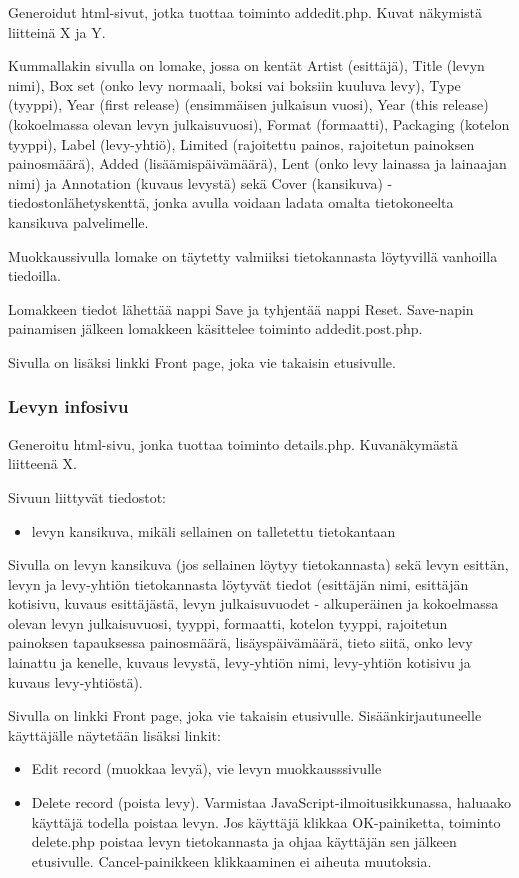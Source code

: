 \documentclass[a4paper,12pt]{report}
\begin{document}
Generoidut html-sivut, jotka tuottaa toiminto addedit.php. Kuvat näkymistä
liitteinä X ja Y.

Kummallakin sivulla on lomake, jossa on kentät Artist (esittäjä), Title
(levyn nimi), Box set (onko levy normaali, boksi vai boksiin kuuluva levy),
Type (tyyppi), Year (first release) (ensimmäisen julkaisun vuosi), Year
(this release) (kokoelmassa olevan levyn julkaisuvuosi), Format (formaatti),
Packaging (kotelon tyyppi), Label (levy-yhtiö), Limited (rajoitettu painos,
rajoitetun painoksen painosmäärä), Added (lisäämispäivämäärä), Lent (onko
levy lainassa ja lainaajan nimi) ja Annotation (kuvaus levystä) sekä Cover
(kansikuva) -tiedostonlähetyskenttä, jonka avulla voidaan ladata omalta
tietokoneelta kansikuva palvelimelle.

Muokkaussivulla lomake on täytetty valmiiksi tietokannasta löytyvillä
vanhoilla tiedoilla.

Lomakkeen tiedot lähettää nappi Save ja tyhjentää nappi Reset. Save-napin
painamisen jälkeen lomakkeen käsittelee toiminto addedit.post.php.

Sivulla on lisäksi linkki Front page, joka vie takaisin etusivulle.

\subsubsection{Levyn infosivu}

Generoitu html-sivu, jonka tuottaa toiminto details.php. Kuvanäkymästä
liitteenä X.

Sivuun liittyvät tiedostot:
\begin{itemize}
  \item levyn kansikuva, mikäli sellainen on talletettu tietokantaan
\end{itemize}

Sivulla on levyn kansikuva (jos sellainen löytyy tietokannasta) sekä levyn
esittän, levyn ja levy-yhtiön tietokannasta löytyvät tiedot (esittäjän nimi,
esittäjän kotisivu, kuvaus esittäjästä, levyn julkaisuvuodet - alkuperäinen
ja kokoelmassa olevan levyn julkaisuvuosi, tyyppi, formaatti, kotelon
tyyppi, rajoitetun painoksen tapauksessa painosmäärä, lisäyspäivämäärä,
tieto siitä, onko levy lainattu ja kenelle, kuvaus levystä, levy-yhtiön
nimi, levy-yhtiön kotisivu ja kuvaus levy-yhtiöstä).

Sivulla on linkki Front page, joka vie takaisin etusivulle.
Sisäänkirjautuneelle käyttäjälle näytetään lisäksi linkit:

\begin{itemize}
  \item Edit record (muokkaa levyä),
		vie levyn muokkausssivulle
  \item Delete record (poista levy).  Varmistaa
    JavaScript-ilmoitusikkunassa, haluaako käyttäjä todella poistaa levyn.
    Jos käyttäjä klikkaa OK-painiketta, toiminto delete.php poistaa levyn
    tietokannasta ja ohjaa käyttäjän sen jälkeen etusivulle.
    Cancel-painikkeen klikkaaminen ei aiheuta muutoksia.
\end{itemize}
\end{document}
